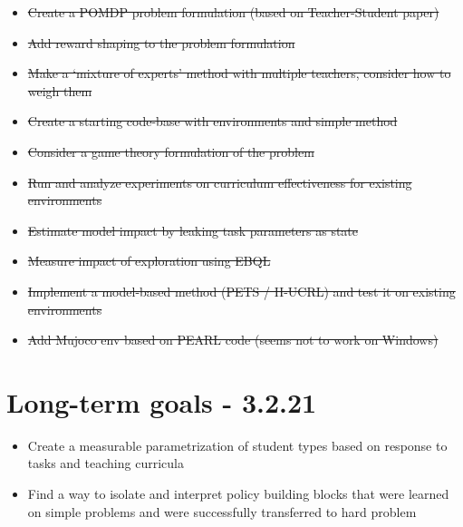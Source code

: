 \documentclass[letterpaper]{article}
\theoremstyle{definition}
\begin{document}
\begin{itemize}
	\item \sout{Create a POMDP problem formulation (based on Teacher-Student paper) }
	\item \sout{Add reward shaping to the problem formulation}
	\item \sout{Make a `mixture of experts' method with multiple teachers, consider how to weigh them}
	\item \sout{Create a starting code-base with environments and simple method}
	\item \sout{Consider a game theory formulation of the problem}
	\item \sout{Run and analyze experiments on curriculum effectiveness for existing environments}
	\item \sout{Estimate model impact by leaking task parameters as state}
	\item \sout{Measure impact of exploration using EBQL}
	\item \sout{Implement a model-based method (PETS / H-UCRL) and test it on existing environments}
	\item \sout{Add Mujoco env based on PEARL code (seems not to work on Windows)}
\end{itemize}


\section{Long-term goals - 3.2.21} \label{sec:long-term}

\begin{itemize}
	\item Create a measurable parametrization of student types based on response to tasks and teaching curricula
	\item Find a way to isolate and interpret policy building blocks that were learned on simple problems and were successfully transferred to hard problem
\end{itemize}
\end{document}
